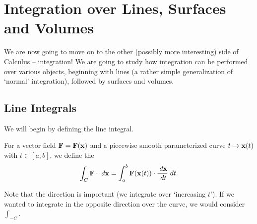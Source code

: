 \documentclass[a4paper]{scrartcl}
\begin{document}
\section{Integration over Lines, Surfaces and Volumes}

We are now going to move on to the other (possibly more interesting) side of Calculus -- integration! We are going to study how integration can be performed over various objects, beginning with lines (a rather simple generalization of `normal' integration), followed by surfaces and volumes.

\subsection{Line Integrals}

We will begin by defining the line integral.

\begin{definition}
	For a vector field $\mathbf{F} = \mathbf{F}(\mathbf{x})$ and a piecewise smooth parameterized curve $t \mapsto \mathbf{x}(t)$ with $t \in [a, b]$, we define the 
	$$
	\int_C \mathbf{F} \cdot \; d \mathbf{x} = \int_a^b \mathbf{F}(\mathbf{x}(t)) \cdot \frac{\; d \mathbf{x}}{\; d t} \; d t.
 	$$
\end{definition}

Note that the direction is important (we integrate over `increasing $t$'). If we wanted to integrate in the opposite direction over the curve, we would consider $\int_{-C}$.
\end{document}
